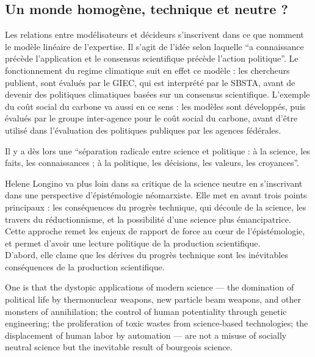 \subsection{Un monde homogène, technique et neutre ?}
\label{ss:model-lineaire}

Les relations entre modélisateurs et décideurs s'inscrivent dans ce que \textcite{aykut_gouverner_2015} nomment le modèle linéaire de l'expertise. Il s'agit de l'idée selon laquelle \enquote{a connaissance précède l’application et le consensus scientifique précède l’action politique}. Le fonctionnement du \gls{regime climatique} suit en effet ce modèle : les chercheurs publient, sont évalués par le GIEC, qui est interprété par le SBSTA, avant de devenir des politiques climatiques basées sur un consensus scientifique. L'exemple du coût social du carbone va aussi en ce sens : les modèles sont développés, puis évalués par le groupe inter-agence pour le coût social du carbone, avant d'être utilisé dans l'évaluation des politiques publiques par les agences fédérales. 

Il y a dès lors une \enquote{séparation radicale entre science et politique : à la science, les faits, les connaissances ; à la politique, les décisions, les valeurs, les croyances}. 


Helene Longino va plus loin dans sa critique de la science neutre en s'inscrivant dans une perspective d'épistémologie néomarxiste. Elle met en avant trois points principaux : les conséquences du progrès technique, qui découle de la science, les travers du réductionnisme, et la possibilité d'une science plus émancipatrice. Cette approche remet les enjeux de rapport de force au cœur de l'épistémologie, et permet d'avoir une lecture politique de la production scientifique. \\

D'abord, elle clame que les dérives du progrès technique sont les inévitables conséquences de la production scientifique.

\begin{authoredquote}
    One is that the dystopic applications of modern science — the domination of political life by thermonuclear weapons, new particle beam weapons, and other monsters of annihilation; the control of human potentiality through genetic engineering; the proliferation of toxic wastes from science-based technologies; the displacement of human labor by automation — are not a misuse of socially neutral science but the inevitable result of bourgeois science.
\end{authoredquote}

